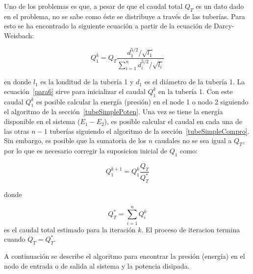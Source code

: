 \documentclass[10pt, oneside]{article}
\begin{document}
Uno de los problemas es que, a pesar de que el caudal total $Q_T$ es un dato dado en el problema, no se sabe como \'este se distribuye a trav\'es de las tuber\'ias. Para esto se ha encontrado la siguiente ecuaci\'on a partir de la ecuaci\'on de Darcy-Weisbach:

\begin{equation}
Q_1^k = Q_T \frac{d_1^{5/2} / \sqrt{l_1}}{\sum_{i=1}^n d_i^{5/2} / \sqrt{l_i}}
\label{para6}
\end{equation}

en donde $l_1$ es la londitud de la tuber\'ia 1 y $d_1$ es el di\'ametro de la tuber\'ia 1. La ecuaci\'on~\ref{para6} sirve para inicializar el caudal $Q_1^k$ en la tuber\'ia 1. Con este caudal $Q_1^k$ es posible calcular la energ\'ia (presi\'on) en el node 1 o nodo 2 siguiendo el algoritmo de la secci\'on~\ref{tubeSimplePoten}. Una vez se tiene la energ\'ia disponible en el sistema ($E_1-E_2$), es posible calcular el caudal en cada una de las otras $n-1$ tuber\'ias siguiendo el algoritmo de la secci\'on~\ref{tubeSimpleCompro}. Sin embargo, es posible que la sumatoria de los $n$ caudales no se sea igual a $Q_T$, por lo que es necesario corregir la suposicion inicial de $Q_1$ como:

\begin{equation}
Q_1^{k+1}= Q_1^k \frac{Q_T}{Q_T^*}
\label{para7}
\end{equation}

donde

\begin{equation}
Q_T^* = \sum_{i=1}^n Q_i^k 
\label{para8}
\end{equation}
es el caudal total estimado para la iteraci\'on $k$. El proceso de iteracion termina cuando $Q_T = Q_T^*$.

A continuaci\'on se describe el algoritmo para encontrar la presi\'on (energ\'ia) en el nodo de entrada o de salida al sistema y la potencia disipada. 
\end{document}
